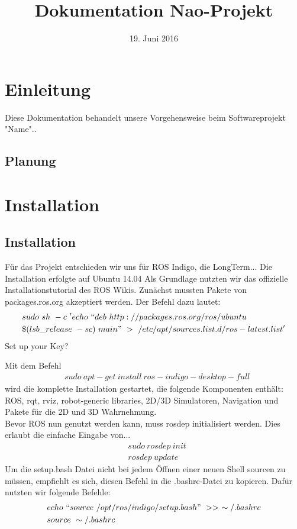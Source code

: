\documentclass{scrartcl}
\title{Dokumentation Nao-Projekt}
\date{19. Juni 2016}
\begin{document}
\maketitle
\tableofcontents
\newpage

\section{Einleitung}

Diese Dokumentation behandelt unsere Vorgehensweise beim Softwareprojekt "Name"..

\subsection{Planung}

\section{Installation}


\subsection{Installation}
Für das Projekt entschieden wir uns für ROS Indigo, die LongTerm... 
Die Installation erfolgte auf Ubuntu 14.04 
Als Grundlage nutzten wir das offizielle Installationstutorial des ROS Wikis.
Zunächst mussten Pakete von packages.ros.org akzeptiert werden. Der Befehl dazu lautet: 
\begin{align}
&sudo\ sh\ -c\ 'echo\ ``deb\ http://packages.ros.org/ros/ubuntu \\ 
&\$(lsb\_release\ -sc)\ main"\ >\ /etc/apt/sources.list.d/ros-latest.list'
\end{align}
Set up your Key?

Mit dem Befehl 
\begin{align}
&sudo\ apt-get\ install\ ros-indigo-desktop-full
\end{align}
wird die komplette Installation gestartet, die folgende Komponenten enthält: ROS, rqt, rviz, robot-generic libraries, 2D/3D Simulatoren, Navigation und Pakete für die 2D und 3D Wahrnehmung.
\\

Bevor ROS nun genutzt werden kann, muss rosdep initialisiert werden. Dies erlaubt die einfache Eingabe von...
\begin{align}
&sudo\ rosdep\ init\\
&rosdep\ update
\end{align}
Um die setup.bash Datei nicht bei jedem Öffnen einer neuen Shell sourcen zu müssen, empfiehlt es sich, diesen Befehl in die .bashrc-Datei zu kopieren.
Dafür nutzten wir folgende Befehle:
\begin{align}
&echo\ ``source\ /opt/ros/indigo/setup.bash"\ >>\ \sim/.bashrc\\
&source\ \sim/.bashrc
\end{align}
\end{document}
